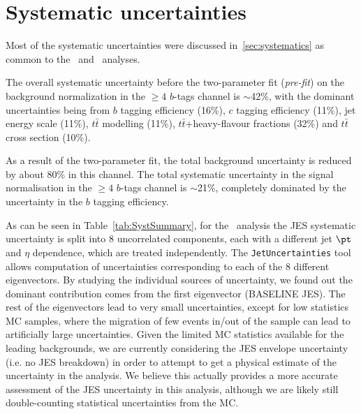 

\section{Systematic uncertainties}\label{sec:htxSYS}

Most of the systematic uncertainties were discussed in~\ref{sec:systematics}
as common to the \wbx\ and \htx\ analyses. 


\begin{table}[h!tb]
\begin{center}
\resizebox{1.\textwidth}{!}{
}
\caption{\label{tab:htxSYS4b} }
\end{center}
\end{table}

The overall systematic uncertainty before the two-parameter fit ({\it pre-fit})
on the background normalization in the $\geq 4$ $b$-tags channel is 
$\sim$42\%, with the dominant uncertainties being from $b$ tagging efficiency (16\%),
$c$ tagging efficiency (11\%), jet energy scale (11\%), $t\bar{t}$ modelling (11\%), 
$t\bar{t}$+heavy-flavour fractions (32\%) and $t\bar{t}$ cross section (10\%).

As a result of the two-parameter fit, the total background uncertainty is reduced 
by about 80\% in this channel. The total  systematic uncertainty
in the signal normalisation in the $\geq 4$ $b$-tags channel is 
$\sim$21\%, completely dominated by the uncertainty in the $b$ tagging efficiency.



As can be seen in Table~\ref{tab:SystSummary}, for the \htx\ analysis
the JES systematic uncertainty is split into 8
uncorrelated components, each with a different jet $\pt$ and $\eta$
dependence, which are treated independently.
The \texttt{JetUncertainties} tool~\cite{jesuncertaintyprovider} allows computation of
uncertainties corresponding to each of the 8 different eigenvectors.
By studying the individual sources of uncertainty, we found out the dominant
contribution comes from the first eigenvector (BASELINE JES). 
The rest of the
eigenvectors lead to very small uncertainties, except for low statistics MC samples,
where the migration of few events in/out of the sample can lead to artificially large
uncertainties. Given the limited MC statistics available for the leading backgrounds,
we are currently considering the JES envelope uncertainty (i.e. no JES breakdown)
in order to attempt to get a physical estimate of the uncertainty in the analysis.
We believe this actually provides a more accurate assessment of the JES uncertainty
in this analysis, although we are likely still double-counting statistical uncertainties from
the MC.




